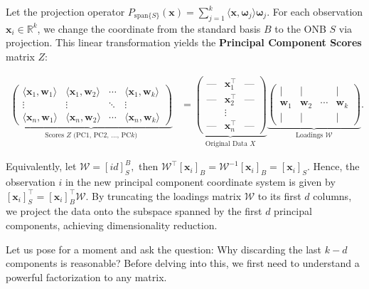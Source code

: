 \documentclass[12pt]{article}
\begin{document}
Let the projection operator $P_{\text{span}\{S\}}(\boldsymbol{x})=\displaystyle\sum_{j=1}^{k}\langle \boldsymbol{x}, \boldsymbol{\omega}_j\rangle \boldsymbol{\omega}_j.$
For each observation $\boldsymbol{x}_i\in\mathbb{R}^k$, we change the coordinate from the standard basis $B$ to the ONB $S$ via projection. This linear transformation yields the \textbf{Principal Component Scores} matrix $Z$:

\begin{align*}
\underbrace{\begin{pmatrix}
\langle \mathbf{x}_1, \mathbf{w}_1 \rangle & \langle \mathbf{x}_1, \mathbf{w}_2 \rangle & \cdots & \langle \mathbf{x}_1, \mathbf{w}_k \rangle \\
\vdots & \vdots & \ddots & \vdots \\
\langle \mathbf{x}_n, \mathbf{w}_1 \rangle & \langle \mathbf{x}_n, \mathbf{w}_2 \rangle & \cdots & \langle \mathbf{x}_n, \mathbf{w}_k \rangle
\end{pmatrix}}_{\text{Scores } Z \text{ (PC1, PC2, }\dots\text{, PC}k\text{)}}
&= 
\underbrace{\begin{pmatrix}
\text{---} & \mathbf{x}_1^\top & \text{---} \\
\text{---} & \mathbf{x}_2^\top & \text{---} \\
 & \vdots & \\
\text{---} & \mathbf{x}_n^\top & \text{---}
\end{pmatrix}}_{\text{Original Data } X}
\underbrace{\begin{pmatrix}
| & | & & | \\
\mathbf{w}_1 & \mathbf{w}_2 & \cdots & \mathbf{w}_k \\
| & | & & |
\end{pmatrix}}_{\text{Loadings } \mathcal{W}}.
\end{align*}

Equivalently, let $\mathcal{W}=[id]^B_S,$ then $\mathcal{W}^\top[\boldsymbol{x}_i]_B = \mathcal{W}^{-1}[\boldsymbol{x}_i]_B=[\boldsymbol{x}_i]_S.$
Hence, the observation $i$ in the new principal component coordinate system is given by $[\boldsymbol{x}_i]_S^\top = [\boldsymbol{x}_i]_B^\top \mathcal{W}.$ 
By truncating the loadings matrix $\mathcal{W}$ to its first $d$ columns, we project the data onto the subspace spanned by the first $d$ principal components, achieving dimensionality reduction.

Let us pose for a moment and ask the question: Why discarding the last $k-d$ components is reasonable?
Before delving into this, we first need to understand a powerful factorization to any matrix.
\end{document}
